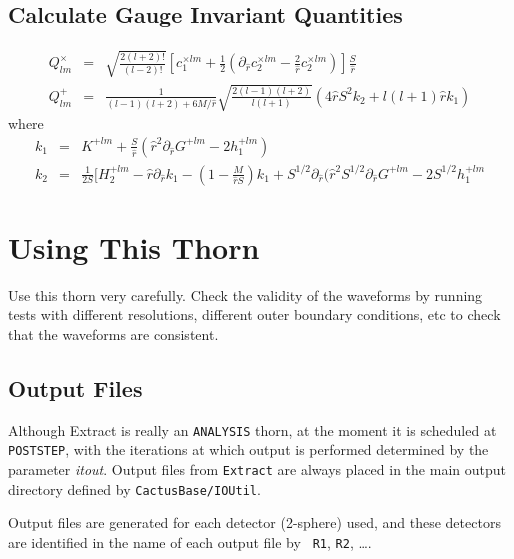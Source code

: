 \documentclass{article}
\begin{document}
\subsection{Calculate Gauge Invariant Quantities}

\begin{eqnarray}
Q^{\times}_{lm} 
  & = & \sqrt{\frac{2(l+2)!}{(l-2)!}}\left[c_1^{\times lm}
        + \frac{1}{2}\left(\partial_{\hat{r}} c_2^{\times lm} - \frac{2}{\hat{r}}
        c_2^{\times lm}\right)\right] \frac{S}{\hat{r}}
\\
Q^{+}_{lm}
  & = & \frac{1}{(l-1)(l+2)+6M/\hat{r}}\sqrt{\frac{2(l-1)(l+2)}{l(l+1)}}
        (4\hat{r}S^2 k_2+l(l+1)\hat{r} k_1) 
\end{eqnarray}
where
\begin{eqnarray}
k_1 & = & K^{+lm} + \frac{S}{\hat{r}}(\hat{r}^2\partial_{\hat{r}} G^{+lm} - 2h^{+lm}_1) \\
k_2 & = & \frac{1}{2S}
          [H^{+lm}_2-\hat{r}\partial_{\hat{r}} k_1-(1-\frac{M}{\hat{r}S}) k_1 + S^{1/2}\partial_{\hat{r}}
          (\hat{r}^2 S^{1/2} \partial_{\hat{r}} G^{+lm}-2S^{1/2}h_1^{+lm}
\end{eqnarray}

\section{Using This Thorn}

Use this thorn very carefully. Check the validity of the waveforms by running
tests with different resolutions, different outer boundary conditions, etc
to check that the waveforms are consistent.


\subsection{Output Files}

Although Extract is really an {\tt ANALYSIS} thorn, at the moment it
is scheduled at {\tt POSTSTEP}, with the iterations at which output is
performed determined by the parameter {\it itout}. Output files from
{\tt Extract} are always placed in the main output directory defined
by {\tt CactusBase/IOUtil}.

Output files are generated for each detector (2-sphere) used, and
these detectors are identified in the name of each output file by {\tt
R1}, {\tt R2}, \ldots.
\end{document}
